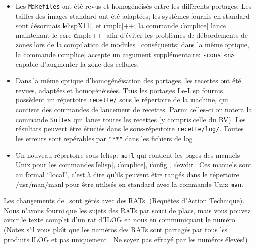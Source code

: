 \begin {itemize}
\item Les {\tt Makefiles} ont \'{e}t\'{e} revus et homog\'{e}n\'{e}is\'{e}s entre les
diff\'{e}rents portages. Les tailles des images standard ont \'{e}t\'{e}
adapt\'{e}es; les syst\`{e}mes fournis en standard sont d\'{e}sormais \|lelispX11|, 
et \|cmplc|++; la commande \|complice| lance maintenant le 
core \|cmplc++| afin d'\'{e}viter les probl\`{e}mes de d\'{e}bordements de
zones lors de la compilation de modules \LeLisp\ cons\'{e}quents; dans la
m\^{e}me optique, la commande \|complice| accepte un argument
suppl\'{e}mentaire: {\tt -cons <n>} capable d'augmenter la zone des cellules.

\item Dans la m\^{e}me optique d'homog\'{e}n\'{e}isation des portages, les
recettes ont \'{e}t\'{e} revues, adapt\'{e}es et homog\'{e}n\'{e}is\'{e}es. Tous les
portages Le-Lisp fournis, poss\`{e}dent un r\'{e}pertoire {\tt recette/}
sous le r\'{e}pertoire de la machine, qui
contient des commandes de lancement de recettes. Parmi celles-ci on
notera la commande {\tt Suites} qui lance toutes les recettes (y
compris celle du BV). Les r\'{e}sultats peuvent \^{e}tre \'{e}tudi\'{e}s dans le
sous-r\'{e}pertoire {\tt recette/log/}. Toutes les erreurs sont
rep\'{e}rables par {\tt "**"} dans les fichiers de log.

\item Un nouveau r\'{e}pertoire sous lelisp: {\tt manl} qui contient les
pages des manuels Unix pour les commandes \|lelisp|, \|complice|,
\|config|, \|newdir|. Ces manuels sont au formal ``local{''}, c'est \`{a}
dire qu'ils peuvent \^{e}tre rang\'{e}s dans le r\'{e}pertoire /usr/man/manl
pour \^{e}tre utilis\'{e}s en standard avec la commande Unix {\tt man}.
\end {itemize}


Les changements de \LeLisp\ sont g\'{e}r\'{e}s avec des \|RATs|
(Requ\^{e}tes d'Action Technique).  Nous n'avons fourni que les sujets
des RATs par souci de place, mais vous pouvez avoir le texte complet
d'un rat d'ILOG en nous en communiquant le num\'{e}ro.  (Notez s'il vous
pla\^{\i}t que les num\'{e}ros des RATs sont partag\'{e}s par tous les produits
ILOG et pas uniquement \LeLisp.  Ne soyez pas effray\'{e} par les
num\'{e}ros \'{e}lev\'{e}s!) \\

\newpage

